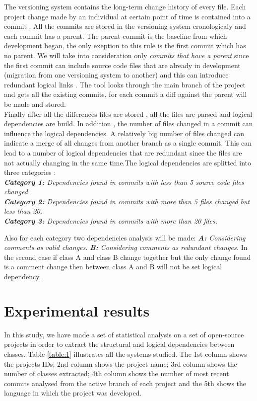 \documentclass[conference]{IEEEtran}
\begin{document}
The versioning system contains the long-term change history of every file. Each project change made by an individual at certain point of time is contained into a commit \cite{svn}. All the commits are stored in the versioning system cronologicaly and each commit has a parent. The parent commit is the baseline from which development began, the only exeption to this rule is the first commit which has no parent. We will take into consideration only \textit{commits that have a parent} since the first commit can include source code files that are already in development (migration from one versioning system to another) and this can introduce redundant logical links \cite{DBLP:journals/jss/AjienkaC17}. The tool looks through the main branch of the project and gets all the existing commits, for each commit a diff against the parent will be made and stored.\\ Finally after all the differences files are stored , all the files are parsed and logical dependencies are build. In addition , the number of files changed in a commit can influence the logical dependencies. A relatively big number of files changed can indicate a merge of all changes from another branch as a single commit. This can lead to a number of logical dependencies that are redundant since the files are not actually changing in the same time.The logical dependencies are splitted into three categories :\\
\textit{\textbf{Category 1:} Dependencies found in commits with less than 5 source code files changed.}\\
\textit{\textbf{Category 2:} Dependencies found in commits with more than 5 files changed but less than 20. }\\
\textit{\textbf{Category 3:} Dependencies found in commits with more than 20 files.}

Also for each category two dependencies analysis will be made:
\textit{\textbf{A:} Considering comments  as valid changes.}
\textit{\textbf{B:} Considering comments  as redundant changes. }
In the second case if class A and class B change together but the only change found is a comment change then between class A and B will not be set logical dependency.


\section{Experimental results}
\label{sec:experiments}


In this study, we have made a set of statistical analysis on a set of open-source projects in order to extract the structural and logical dependencies between classes. Table \ref{table:1} illustrates all the systems studied. The 1st column shows the projects IDs; 2nd column shows the project name; 3rd column shows the number of classes extracted; 4th column shows the number of most recent commits analysed from the active branch of each project and the 5th shows the language in which the project was developed.
\end{document}
